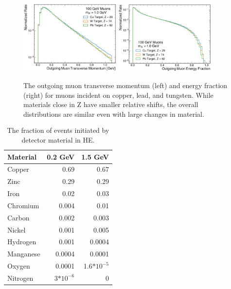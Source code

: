 \begin{figure}[!htbp]
    \centering
    \includegraphics[width=0.45\textwidth]{figures/muon_material_comp_pt.pdf}
    \hspace{0.01\textwidth}
    \includegraphics[width=0.45\textwidth]{figures/muon_material_comp_efrac.pdf}
    \caption[
        Material dependence of \dbrem kinematics.
    ]{
        The outgoing muon transverse momentum (left) and energy fraction (right) for muons incident on copper, lead, and tungsten. While materials close in Z have smaller relative shifts, the overall distributions are similar even with large changes in material. 
    }
    \label{fig:dbrem_material}
\end{figure}

\begin{table}[ht]
    \centering
    \begin{center}
        \begin{tabular}{@{}l rr@{}}
            \toprule
            Material & 0.2 GeV & 1.5 GeV\\
            \midrule
            Copper&0.69&0.67\\
            Zinc&0.29&0.29\\
            Iron&0.02&0.03\\
            Chromium&0.004&0.01\\
            Carbon&0.002&0.003\\
            Nickel&0.001&0.005\\
            Hydrogen&0.001&0.0004\\
            Manganese&0.0004&0.0001\\
            Oxygen&0.0001&1.6$*10^{-5}$\\
            Nitrogen&3$*10^{-6}$&0\\
            \bottomrule
        \end{tabular}
        \caption{
            The fraction of \dbrem events initiated by detector material in HE.
        }
        \label{table:dbrem_material}
    \end{center}
\end{table}
    
